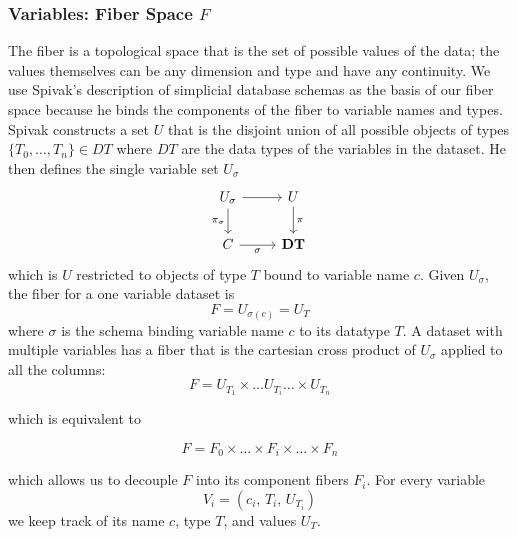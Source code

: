 \documentclass[../main.tex]{subfiles}
\begin{document}
\subsubsection{Variables: Fiber Space $F$}
\label{sec:data_fiber}
The fiber is a topological space that is the set of possible values of the data; the values themselves can be any dimension and type and have any continuity. We use Spivak's description of simplicial database schemas \cite{spivakSIMPLICIALDATABASES} as the basis of our fiber space because he binds the components of the fiber to variable names and types. Spivak constructs a set $U$ that is the disjoint union of all possible objects of types $\{T_0, \ldots, T_n\} \in DT$ where $DT$ are the data types of the variables in the dataset. He then defines the single variable set $U_\sigma$ 
\begin{equation}
    \label{eq:data_types}
\begin{tikzcd}
    U_{\sigma} \arrow[r] \arrow[d, "\pi_{\sigma}"'] & U \arrow[d, "\pi"] \\
    C \arrow[r, "\sigma"']                          & \textbf{DT}       
\end{tikzcd}
\end{equation}
which is $U$ restricted to objects of type $T$ bound to variable name $c$. Given $U_{\sigma}$, the fiber for a one variable dataset is
\begin{equation}
    F = U_{\sigma(c)} = U_{T} 
\end{equation}
where $\sigma$ is the schema binding variable name $c$ to its datatype $T$. A dataset with multiple variables has a fiber that is the cartesian cross product of $U_{\sigma}$ applied to all the columns:
\begin{equation}
F = U_{T_1}\times \ldots U_{T_i} \ldots\times U_{T_n}
\end{equation}

which is equivalent to 

\begin{equation}
    F= F_{0} \times \ldots \times F_{i}\times\ldots\times F_{n}
\end{equation}

which allows us to decouple $F$ into its component fibers $F_i$. For every variable
\begin{equation}
V_i = (c_i,\, T_i,\, U_{T_i})
\end{equation} 
we keep track of its name $c$, type $T$, and values $U_{T}$. 
\end{document}
